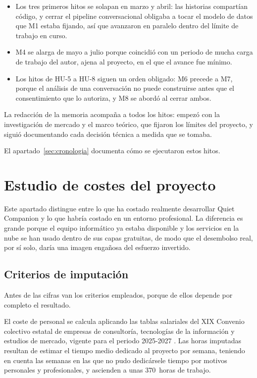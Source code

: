 \begin{itemize}
    \item Los tres primeros hitos se solapan en marzo y abril: las historias compartían código, y cerrar el pipeline conversacional obligaba a tocar el modelo de datos que M1 estaba fijando, así que avanzaron en paralelo dentro del límite de trabajo en curso.
    \item M4 se alarga de mayo a julio porque coincidió con un periodo de mucha carga de trabajo del autor, ajena al proyecto, en el que el avance fue mínimo.
    \item Los hitos de HU-5 a HU-8 siguen un orden obligado: M6 precede a M7, porque el análisis de una conversación no puede construirse antes que el consentimiento que lo autoriza, y M8 se abordó al cerrar ambos.
\end{itemize}

La redacción de la memoria acompaña a todos los hitos: empezó con la investigación de mercado y el marco teórico, que fijaron los límites del proyecto, y siguió documentando cada decisión técnica a medida que se tomaba.

El apartado~\ref{sec:cronologia} documenta cómo se ejecutaron estos hitos.

\section{Estudio de costes del proyecto}
\label{sec:costes}

Este apartado distingue entre lo que ha costado realmente desarrollar Quiet Companion y lo que habría costado en un entorno profesional. La diferencia es grande porque el equipo informático ya estaba disponible y los servicios en la nube se han usado dentro de sus capas gratuitas, de modo que el desembolso real, por sí solo, daría una imagen engañosa del esfuerzo invertido.

\subsection{Criterios de imputación}

Antes de las cifras van los criterios empleados, porque de ellos depende por completo el resultado.

El coste de personal se calcula aplicando las tablas salariales del XIX Convenio colectivo estatal de empresas de consultoría, tecnologías de la información y estudios de mercado, vigente para el periodo 2025-2027 \citep{ConvenioTIC2025}. Las horas imputadas resultan de estimar el tiempo medio dedicado al proyecto por semana, teniendo en cuenta las semanas en las que no pudo dedicársele tiempo por motivos personales y profesionales, y ascienden a unas 370~horas de trabajo.

